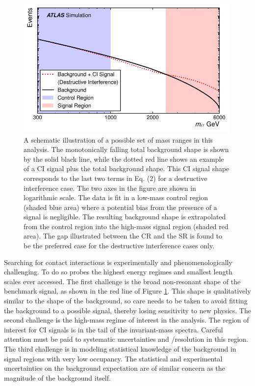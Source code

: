 \begin{figure}[h!]
\captionsetup[subfigure]{position=b}
\centering
\includegraphics[width=0.99\textwidth]{figures/ci/massRanges.pdf}
\caption{A schematic illustration of a possible set of mass ranges in this analysis. The monotonically falling total background shape is shown by the solid black line, while the dotted red line shows an example of a CI signal plus the total background shape. This CI signal shape corresponds to the last two terms in Eq. (2) for a destructive interference case. The two axes in the figure are shown in logarithmic scale. The data is fit in a low-mass control region (shaded blue area) where a potential bias from the presence of a signal is negligible. The resulting background shape is extrapolated from the control region into the high-mass signal region (shaded red area). The gap illustrated between the CR and the SR is found to be the preferred case for the destructive interference cases only.}
\label{fig:ciStrat}
\end{figure}

Searching for contact interactions is experimentally and phenomenologically challenging.
To do so probes the highest energy regimes and smallest length scales ever accessed.
The first challenge is the broad non-resonant shape of the benchmark signal, as shown in the red line of Figure \ref{fig:ciStrat}.
This shape is qualitatively similar to the shape of the background, so care needs to be taken to avoid fitting the background to a possible signal, thereby losing sensitivity to new physics.
The second challenge is the high-mass regime of interest in the analysis. The region of interest for CI signals is in the tail of the invariant-mass spectra.
Careful attention must be paid to systematic uncertainties and \pt/\et resolution in this region.
The third challenge is in modeling statistical knowledge of the background in signal regions with very low occupancy.
The statistical and experimental uncertainties on the background expectation are of similar concern as the magnitude of the background itself.

